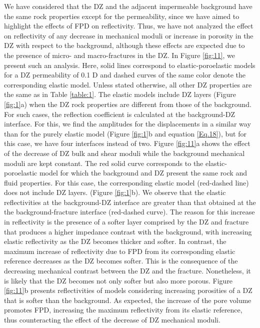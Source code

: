 \documentclass[draft]{agujournal2019}
\begin{document}
We  have considered that the DZ and the adjacent impermeable background have the same rock properties except for the permeability, since we  have aimed to highlight the effects of FPD on reflectivity.
Thus, we have not analyzed the effect on reflectivity of any  decrease in mechanical moduli or increase in porosity in the DZ with respect to the background, although these effects are expected due to the presence of micro- and macro-fractures in the DZ. In Figure \ref{fig:11}, we present such an analysis. Here, solid lines correspond to elastic-poroelastic models for a DZ permeability of 0.1 D and dashed curves of the same color denote the corresponding elastic model. Unless stated otherwise, all other DZ properties are the same as in Table \ref{table:1}.
The elastic models include DZ layers (Figure \ref{fig:1}a)
when the DZ rock properties are different from those of the background.
For such cases, the reflection coefficient is calculated at the background-DZ interface. 
For this, we find the amplitudes for the displacements in a similar way than for the purely elastic model (Figure \ref{fig:1}b and equation \eqref{Eq.18}), but for this case, we have four interfaces instead of two.
Figure \ref{fig:11}a shows the effect of the decrease of DZ bulk and shear moduli while the background mechanical moduli are kept constant. The red solid curve corresponds to the elastic-poroelastic model for which the background and DZ present the same rock and fluid properties. For this case, the corresponding elastic model (red-dashed line) does not include DZ layers. (Figure \ref{fig:1}b).
We observe that the elastic reflectivities at the background-DZ interface are greater than that obtained at the the background-fracture interface (red-dashed curve). The reason for this increase in reflectivity is the presence of a softer layer comprised by the DZ and fracture that produces a higher impedance contrast with the background, with increasing elastic reflectivity as the DZ becomes thicker and softer. In contrast,  the maximum increase of reflectivity due to FPD from its corresponding elastic reference decreases as the DZ becomes softer. This is the consequence of the decreasing mechanical contrast between the DZ and the fracture. Nonetheless, it is likely that the DZ becomes not only softer but also more porous. Figure \ref{fig:11}b presents reflectivities of models considering  increasing porosities of a DZ that is softer than the background. As expected, the increase of the pore volume promotes FPD, increasing the maximum reflectivity from its elastic reference, thus counteracting the effect of the decrease of DZ mechanical moduli.
\end{document}
